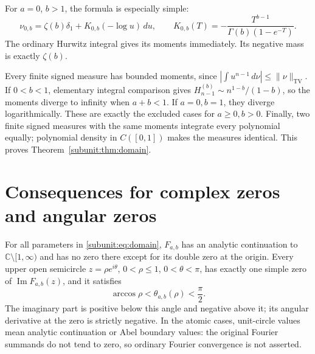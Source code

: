 For $a=0$, $b>1$, the formula is especially simple:
\begin{equation}\label{subunit:eq:aZero}
 \nu_{0,b}=\zeta(b)\delta_1+K_{0,b}(-\log u)\,du,
 \qquad K_{0,b}(T)=-\frac{T^{b-1}}{\Gamma(b)(1-e^{-T})}.
\end{equation}
The ordinary Hurwitz integral gives its moments immediately. Its
negative mass is exactly $\zeta(b)$.

Every finite signed measure has bounded moments, since
$|\int u^{n-1}\,d\nu|\leq\|\nu\|_{\mathrm{TV}}$.
If $0<b<1$, elementary integral comparison gives
$H_{n-1}^{(b)}\sim n^{1-b}/(1-b)$, so the moments diverge to
infinity when $a+b<1$. If $a=0,b=1$, they diverge logarithmically.
These are exactly the excluded cases for $a\geq0,b>0$.
Finally, two finite signed measures with the same moments integrate
every polynomial equally; polynomial density in $C([0,1])$ makes the
measures identical. This proves Theorem~\ref{subunit:thm:domain}.

\section{Consequences for complex zeros and angular zeros}

\begin{theorem}
\label{subunit:thm:zerofree}
For all parameters in \eqref{subunit:eq:domain}, $F_{a,b}$ has an
analytic continuation to $\mathbb C\setminus[1,\infty)$ and has no
zero there except for its double zero at the origin. Every upper
open semicircle $z=\rho e^{i\theta}$, $0<\rho\leq1$, $0<\theta<\pi$,
has exactly one
simple zero of $\operatorname{Im}F_{a,b}(z)$, and it satisfies
\[
 \arccos\rho<\theta_{a,b}(\rho)<\frac\pi2.
\]
The imaginary part is positive below this angle and negative above
it; its angular derivative at the zero is strictly negative.
In the atomic cases, unit-circle values mean analytic continuation
or Abel boundary values: the original Fourier summands do not tend
to zero, so ordinary Fourier convergence is not asserted.
\end{theorem}

